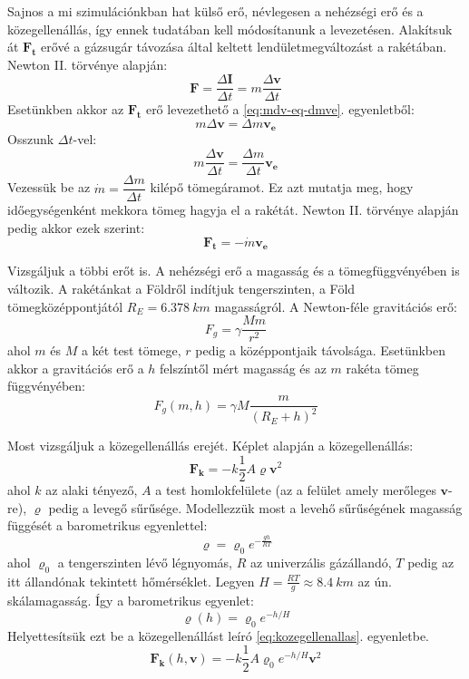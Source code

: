 \documentclass[12pt]{article}
\renewcommand{\vec}[1]{\mathbf{#1}} %
\begin{document}
Sajnos a mi szimulációnkban hat külső erő, névlegesen a nehézségi erő és a közegellenállás, így ennek tudatában kell módosítanunk a levezetésen.
Alakítsuk át $\vec{F_t}$ erővé a gázsugár távozása által keltett lendületmegváltozást a rakétában. Newton II. törvénye alapján:
\begin{equation}
    \vec{F} = \dfrac{\Delta \vec{I}}{\Delta t} = m\dfrac{\Delta \vec{v}}{\Delta t}
    \label{eq:newton2}
\end{equation}
Esetünkben akkor az $\vec{F_t}$ erő levezethető a \ref{eq:mdv-eq-dmve}. egyenletből:
\[m\Delta\vec{v} = \Delta m \vec{v_e}\]
Osszunk $\Delta t$-vel:
\[m\dfrac{\Delta \vec{v}}{\Delta t} = \dfrac{\Delta m}{\Delta t} \vec{v_e}\]
Vezessük be az $\dot{m} = \dfrac{\Delta m}{\Delta t}$ kilépő tömegáramot. Ez azt mutatja meg, hogy időegységenként mekkora tömeg hagyja el a rakétát. Newton II. törvénye alapján pedig akkor ezek szerint:
\begin{equation}
    \vec{F_t} = -\dot{m}\vec{v_e}
\end{equation}

Vizsgáljuk a többi erőt is. A nehézségi erő a magasság és a tömegfüggvényében is változik. A rakétánkat a Földről indítjuk tengerszinten, a Föld
tömegközéppontjától $R_E = \qty{6,378}{km}$ magasságról. A Newton-féle gravitációs erő:
\begin{equation}
    F_{g} = \gamma \frac{Mm}{r^2}
\end{equation}
ahol $m$ és $M$ a két test tömege, $r$ pedig a középpontjaik távolsága. Esetünkben akkor a gravitációs erő a $h$ felszíntől mért magasság és az $m$ rakéta tömeg függvényében:
\begin{equation}
    F_g(m,h) = \gamma M \frac{m}{(R_E + h)^2}
    \label{eq:F_g-m-t}
\end{equation}

Most vizsgáljuk a közegellenállás erejét. Képlet alapján a közegellenállás:
\begin{equation}
    \vec{F_k} = - k\frac{1}{2}A\varrho\vec{v}^2
    \label{eq:kozegellenallas}
\end{equation}
ahol $k$ az alaki tényező, $A$ a test homlokfelülete (az a felület amely merőleges $\vec{v}$-re), $\varrho$ pedig a levegő sűrűsége. Modellezzük most a levehő sűrűségének
magasság függését a barometrikus egyenlettel:
\begin{equation}
    \varrho = \varrho_0 e^{-\frac{gh}{RT}}
\end{equation}
ahol $\varrho_0$ a tengerszinten lévő légnyomás, $R$ az univerzális gázállandó, $T$ pedig az itt állandónak tekintett hőmérséklet. Legyen $H = \frac{RT}{g} \approx \qty{8,4}{km}$ az ún. skálamagasság.
Így a barometrikus egyenlet:
\begin{equation}
    \varrho(h) = \varrho_0 e^{-h/H}
\end{equation}
Helyettesítsük ezt be a közegellenállást leíró \ref{eq:kozegellenallas}. egyenletbe.
\begin{equation}
    \vec{F_k}(h,\vec{v}) = - k\frac{1}{2}A\varrho_0 e^{-h/H}\vec{v}^2
\end{equation}
\end{document}
